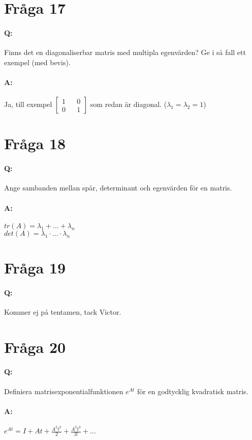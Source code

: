 \documentclass[a4paper]{article}
\begin{document}
\section{Fråga 17}
\paragraph{Q:} Finns det en diagonaliserbar matris med multipla egenvärden? Ge i så fall ett exempel (med bevis). 
\paragraph{A:} Ja, till exempel $\begin{bmatrix} 1 && 0 \\ 0 && 1 \end{bmatrix}$ som redan är diagonal. ($\lambda_1=\lambda_2=1$)

\section{Fråga 18}
\paragraph{Q:} Ange sambanden mellan spår, determinant och egenvärden för en matris.
\paragraph{A:} $tr(A)=\lambda_1 + \ldots + \lambda_n$ \\ $det(A)=\lambda_1 \cdot \ldots \cdot \lambda_n$

\section{Fråga 19}
\paragraph{Q:} Kommer ej på tentamen, tack Victor.

\section{Fråga 20}
\paragraph{Q:} Definiera matrisexponentialfunktionen $e^{At}$ för en godtycklig kvadratisk matris. 
\paragraph{A:} $e^{At} = I + At + \frac{A^2t^2}{2} +  \frac{A^3t^3}{3!} + \ldots$
\end{document}
